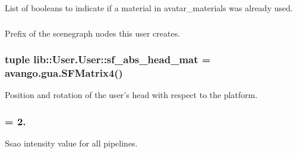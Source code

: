 \-List of booleans to indicate if a material in avatar\-\_\-materials was already used. 

\hypertarget{classlib_1_1User_1_1User_af909d4906b92076798e62e6db9d1174c}{
\subsubsection[{node\-\_\-pretext}]{}}\label{classlib_1_1User_1_1User_af909d4906b92076798e62e6db9d1174c}


\-Prefix of the scenegraph nodes this user creates. 

\hypertarget{classlib_1_1User_1_1User_a633650301e37ff69cba4e51c2ed4f7a5}{
\subsubsection[{sf\-\_\-abs\-\_\-head\-\_\-mat}]{\setlength{\rightskip}{0pt plus 5cm}tuple {\bf lib\-::\-User.\-User\-::sf\-\_\-abs\-\_\-head\-\_\-mat} = avango.\-gua.\-S\-F\-Matrix4()}}\label{classlib_1_1User_1_1User_a633650301e37ff69cba4e51c2ed4f7a5}


\-Position and rotation of the user's head with respect to the platform. 

\hypertarget{classlib_1_1User_1_1User_a71b7508fdf83ab837f009c32cd45652e}{
\subsubsection[{ssao\-\_\-intensity}]{ = 2.}}\label{classlib_1_1User_1_1User_a71b7508fdf83ab837f009c32cd45652e}


\-Ssao intensity value for all pipelines. 

